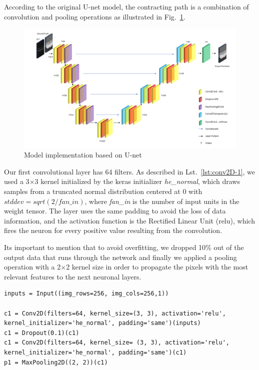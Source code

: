 \documentclass[12pt,a4paper]{scrartcl}
\begin{document}
According to the original U-net model, the contracting path is a combination of convolution and pooling operations as illustrated in Fig.~\ref{fig:model}.

\begin{figure}[H]
    \centering
    \includegraphics[width=\textwidth]{./images/U-net_ThesisVersion.png}
    \caption{Model implementation based on U-net}
    \label{fig:model}
\end{figure}

Our first convolutional layer has 64 filters. As described in Lst.~\ref{lst:conv2D-1}, we used a 3$\times$3 kernel initialized by the keras initializer \emph{he\_normal}, which draws samples from a truncated normal distribution centered at 0 with $stddev = sqrt(2 / fan\_in)$, where \emph{fan\_in} is the number of input units in the weight tensor. The layer uses the same padding to avoid the loss of data information, and the activation function is the Rectified Linear Unit (relu), which fires the neuron for every positive value resulting from the convolution. 

It\textquotesingle s important to mention that to avoid overfitting, we dropped 10\% out of the output data that runs through the network and finally we applied a pooling operation with a 2$\times$2 kernel size in order to propagate the pixels with the most relevant features to the next neuronal layers.

\begin{lstlisting}[caption={Implementation of the first level of the contracting path, the rest of the layer can be found in the \emph{get\_unet()} method from \emph{model.py}}, label={lst:conv2D-1}]
inputs = Input((img_rows=256, img_cols=256,1))

c1 = Conv2D(filters=64, kernel_size=(3, 3), activation='relu', kernel_initializer='he_normal', padding='same')(inputs)
c1 = Dropout(0.1)(c1)
c1 = Conv2D(filters=64, kernel_size= (3, 3), activation='relu', kernel_initializer='he_normal', padding='same')(c1)
p1 = MaxPooling2D((2, 2))(c1)
\end{lstlisting}
\end{document}
